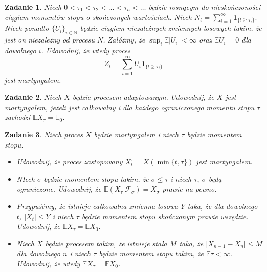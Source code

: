 \documentclass{mwart}
\newtheorem{zd}{Zadanie}
\begin{document}
\begin{zd}
	Niech $0 < \tau_1 < \tau_2 < \dots < \tau_n < \dots $ będzie rosnącym do nieskończoności ciągiem momentów stopu o skończonych wartościach. Niech $N_t = \sum_{i = 1}^{\infty}\pmb{1}_{\{t \geq \tau_i\}}.$ Niech ponadto $\{U_i\}_{i \in \mathbb{N}}$ będzie ciągiem niezależnych zmiennych losowych takim, że jest on niezależny od procesu $N$. Załóżmy, że $\sup_i\mathbb{E}|U_i|< \infty$ oraz $\mathbb{E}U_i = 0$ dla dowolnego $i$. Udowodnij, że wtedy proces
	\begin{displaymath}
		Z_t = \sum_{i = 1}^{\infty}U_i\pmb{1}_{\{t \geq \tau_i\}}
	\end{displaymath}
	jest martyngałem.
\end{zd}

\begin{zd}
Niech $X$ będzie procesem adaptowanym. Udowodnij, że $X$ jest martyngałem, jeżeli jest całkowalny i dla każdego ograniczonego momentu stopu $\tau$ zachodzi $\mathbb{E}X_{\tau} = \mathbb{E}_0$.
\end{zd}

\begin{zd}
Niech proces $X$ będzie martyngałem i niech $\tau$ będzie momentem stopu.
\begin{itemize}
\item Udowodnij, że proces zastopowany $X^{\tau}_t = X(\min\{t, \tau\})$ jest martyngałem.
\item NIech $\sigma$ będzie momentem stopu takim, że $\sigma \leq \tau$ i niech $\tau,\ \sigma$ będą ograniczone. Udowodnij, że $\mathbb{E}\left(X_{\tau}|\mathcal{F}_{\sigma}\right) = X_{\sigma}$ prawie na pewno.
\item Przypuśćmy, że istnieje całkowalna zmienna losowa $Y$ taka, że dla dowolnego $t$, $|X_t| \leq Y$ i niech $\tau$ będzie momentem stopu skończonym prawie wszędzie. Udowodnij, że $\mathbb{E}X_{\tau} = \mathbb{E}X_0 $.
\item Niech $X$ będzie procesem takim, że istnieje stała $M$ taka, że $|X_{n-1} - X_n| \leq M$ dla dowolnego $n$ i niech $\tau$ będzie momentem stopu takim, że $\mathbb{E}\tau < \infty$. Udowodnij, że wtedy $\mathbb{E}X_{\tau} = \mathbb{E}X_0$.
\end{itemize}
\end{zd}
\end{document}
